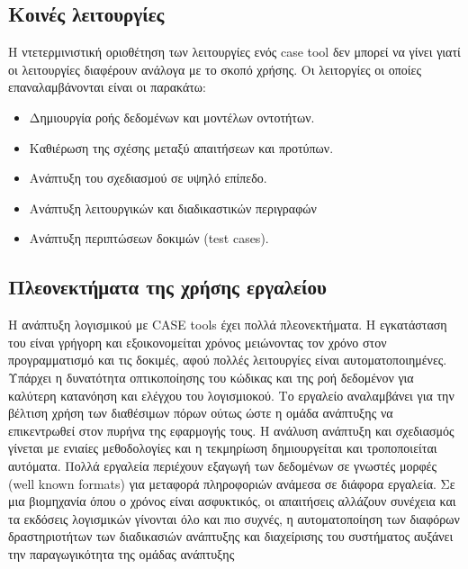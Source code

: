 \subsection{Kοινές λειτουργίες}
Η ντετερμινιστική οριοθέτηση των λειτουργίες ενός case tool δεν μπορεί να γίνει γιατί οι λειτουργίες διαφέρουν ανάλογα με το σκοπό χρήσης. Οι λειτοργίες οι οποίες επαναλαμβάνονται είναι οι παρακάτω:
\begin{itemize}
	\item Δημιουργία ροής δεδομένων και μοντέλων οντοτήτων.
	\item Καθιέρωση της σχέσης μεταξύ απαιτήσεων και προτύπων.
	\item Ανάπτυξη του σχεδιασμού σε υψηλό επίπεδο.
	\item Ανάπτυξη λειτουργικών και διαδικαστικών περιγραφών
	\item Ανάπτυξη περιπτώσεων δοκιμών (test cases).	
\end{itemize}

\subsection{Πλεονεκτήματα της χρήσης εργαλείου}
H ανάπτυξη λογισμικού με CASE tools έχει πολλά πλεονεκτήματα. Η εγκατάσταση του είναι γρήγορη και εξοικονομείται χρόνος μειώνοντας τον χρόνο στον προγραμματισμό και τις δοκιμές, αφού πολλές λειτουργίες είναι αυτοματοποιημένες. Υπάρχει η δυνατότητα οπτικοποίησης του κώδικας και της ροή δεδομένον για καλύτερη κατανόηση και ελέγχου του λογισμιοκού. Το εργαλείο αναλαμβάνει για την βέλτιση χρήση των διαθέσιμων πόρων ούτως ώστε η ομάδα ανάπτυξης να επικεντρωθεί στον πυρήνα της εφαρμογής τους. Η ανάλυση ανάπτυξη και σχεδιασμός γίνεται με ενιαίες μεθοδολογίες και η τεκμηρίωση δημιουργείται και τροποποιείται αυτόματα. Πολλά εργαλεία περιέχουν εξαγωγή των δεδομένων σε γνωστές μορφές (well known formats) για μεταφορά πληροφοριών ανάμεσα σε διάφορα εργαλεία. Σε μια βιομηχανία όπου ο χρόνος είναι ασφυκτικός, οι απαιτήσεις αλλάζουν συνέχεια και τα εκδόσεις λογισμικών γίνονται όλο και πιο συχνές, η αυτοματοποίηση των διαφόρων δραστηριοτήτων των διαδικασιών ανάπτυξης και διαχείρισης του συστήματος αυξάνει την παραγωγικότητα της ομάδας ανάπτυξης 

